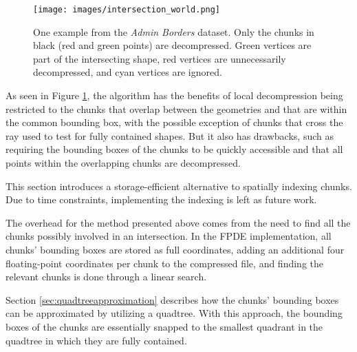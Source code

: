 \begin{figure}[htb]
    \centering
    \texttt{[image: images/intersection\_world.png]}
    \caption{One example from the \emph{Admin Borders} dataset. Only the chunks in black (red and green points) are decompressed. Green vertices are part of the intersecting shape, red vertices are unnecessarily decompressed, and cyan vertices are ignored. }
    \label{fig:intworld}
\end{figure}

As seen in Figure \ref{fig:intworld}, the algorithm has the benefits of local decompression being restricted to the chunks that overlap between the geometries and that are within the common bounding box, with the possible exception of chunks that cross the ray used to test for fully contained shapes. But it also has drawbacks, such as requiring the bounding boxes of the chunks to be quickly accessible and that all points within the overlapping chunks are decompressed.

\label{sec:quadtreechunk}
This section introduces a storage-efficient alternative to spatially indexing chunks. Due to time constraints, implementing the indexing is left as future work.

The overhead for the method presented above comes from the need to find all the chunks possibly involved in an intersection. In the FPDE implementation, all chunks' bounding boxes are stored as full coordinates, adding an additional four floating-point coordinates per chunk to the compressed file, and finding the relevant chunks is done through a linear search. 

Section \ref{sec:quadtreeapproximation} describes how the chunks' bounding boxes can be approximated by utilizing a quadtree. With this approach, the bounding boxes of the chunks are essentially snapped to the smallest quadrant in the quadtree in which they are fully contained.


